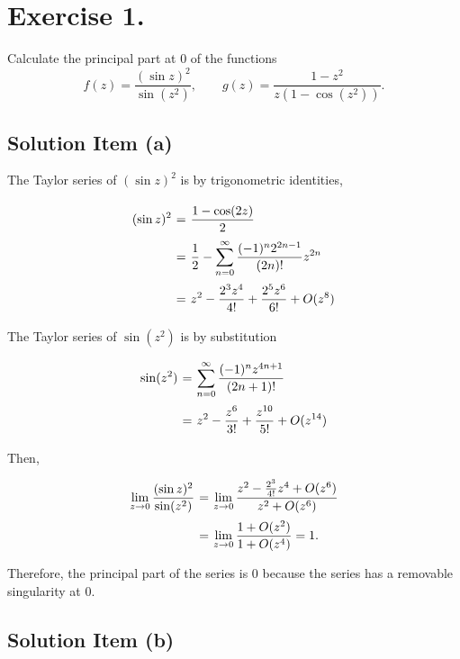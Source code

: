 \section*{Exercise 1.}

Calculate the principal part at 0 of the functions
\[ f(z) = \frac{(\sin z)^2}{\sin(z^2)}, \hspace{2em} g(z) = \frac{1-z^2}{z(1-\cos(z^2))}.  \]

\subsection*{Solution Item (a)}
The Taylor series of $(\sin z)^2$ is by trigonometric identities,
\[ \everymath{\displaystyle}
\arraycolsep=1.8pt\def\arraystretch{2.5}
\begin{array}{rcl}
    (\sin z)^2 & = & \frac{1-\cos(2z)}{2}\\
    & = & \frac{1}{2} - \sum_{n = 0}^{\infty} \frac{(-1)^n 2^{2n-1}}{(2n)!} z^{2n}\\
    & = & z^2 - \frac{2^3 z^4}{4!} + \frac{2^5 z^6}{6!} + O(z^8)
\end{array} \]

The Taylor series of $\sin (z^2)$ is by substitution
\[ \everymath{\displaystyle}
\arraycolsep=1.8pt\def\arraystretch{2.5}
\begin{array}{rcl}
    \sin(z^2) & = & \sum_{n = 0}^{\infty} \frac{(-1)^n z^{4n+1}}{(2n+1)!}\\
    & = & z^2 - \frac{z^6}{3!} + \frac{z^{10}}{5!} + O(z^{14})
\end{array} \]

Then,
\[ \everymath{\displaystyle}
\arraycolsep=1.8pt\def\arraystretch{2.5}
\begin{array}{rcl}
    \lim_{z\to 0} \frac{(\sin z)^2}{\sin(z^2)} & = & \lim_{z\to 0} \frac{z^2 - \frac{2^3}{4!} z^4 + O(z^6) }{z^2 + O(z^6)}\\
    & = & \lim_{z\to 0} \frac{1 + O(z^2)}{1 + O(z^4)} = 1.
\end{array} \]

Therefore, the principal part of the series is 0 because the series has a removable singularity at 0.

\subsection*{Solution Item (b)}

